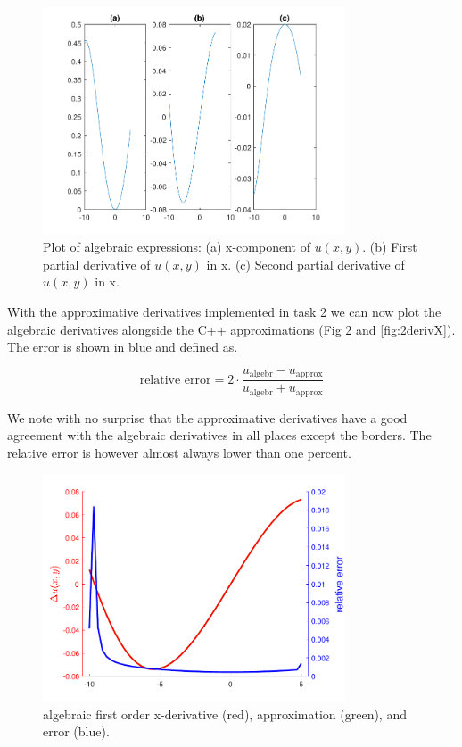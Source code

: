 \documentclass[paper=a4, fontsize=12pt]{article} %
\begin{document}
\begin{figure}[H]
  \centering
  \includegraphics[width=0.8\textwidth]{algebraicDeriv.pdf}
  \caption{\small Plot of algebraic expressions: (a) x-component of $u(x,y)$. (b) First partial derivative of $u(x,y)$ in x. (c) Second partial derivative of $u(x,y)$ in x.\label{fig:algebraic}}
\end{figure}

With the approximative derivatives implemented in task 2 we can now plot the algebraic derivatives alongside the C++ approximations (Fig \ref{fig:1derivX} and \ref{fig:2derivX}). The error is shown in blue and defined as. 

$$\textrm{relative error} = 2\cdot \frac{u_\textrm{algebr} - u_\textrm{approx}}{u_\textrm{algebr} + u_\textrm{approx}}$$

We note with no surprise that the approximative derivatives have a good agreement with the algebraic derivatives in all places except the borders. The relative error is however almost always lower than one percent.


\begin{figure}[H]
  \centering
  \includegraphics[width=0.8\textwidth]{comparison-x.pdf}
  \caption{\small algebraic first order x-derivative (red), approximation (green), and error (blue).\label{fig:1derivX}}
\end{figure}
\end{document}
